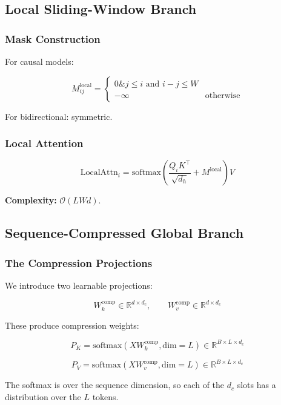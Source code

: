 \subsection{Local Sliding-Window Branch}

\subsubsection{Mask Construction}

For causal models:

\[
M_{ij}^\text{local} = \begin{cases} 0 \& j \leq i \text{ and } i - j \leq W \\ -\infty & \text{otherwise} \end{cases}
\]

For bidirectional: symmetric.

\subsubsection{Local Attention}

\[
\text{LocalAttn}_i = \text{softmax}\!\left(\frac{Q_i K^\top}{\sqrt{d_h}} + M^\text{local}\right) V
\]

\textbf{Complexity:} $\mathcal{O}(L W d)$.

\subsection{Sequence-Compressed Global Branch}

\subsubsection{The Compression Projections}

We introduce two learnable projections:

\[
W_k^\text{comp} \in \mathbb{R}^{d \times d_c}, \qquad
W_v^\text{comp} \in \mathbb{R}^{d \times d_c}
\]

These produce compression weights:

\[
P_K = \text{softmax}\!\left(X W_k^\text{comp}, \text{dim}=L\right) \in \mathbb{R}^{B \times L \times d_c}
\]

\[
P_V = \text{softmax}\!\left(X W_v^\text{comp}, \text{dim}=L\right) \in \mathbb{R}^{B \times L \times d_c}
\]

The softmax is over the sequence dimension, so each of the $d_c$ slots has 
a distribution over the $L$ tokens.

